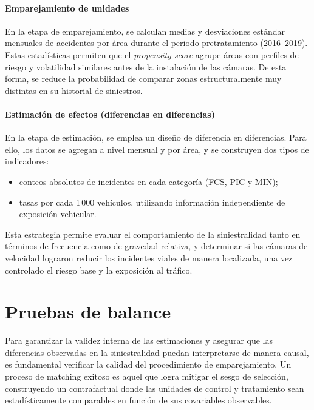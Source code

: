 \paragraph{Emparejamiento de unidades}

En la etapa de emparejamiento, se calculan medias y desviaciones estándar mensuales de accidentes por área durante el periodo pretratamiento (2016--2019). Estas estadísticas permiten que el \textit{propensity score} agrupe áreas con perfiles de riesgo y volatilidad similares antes de la instalación de las cámaras. De esta forma, se reduce la probabilidad de comparar zonas estructuralmente muy distintas en su historial de siniestros.

\paragraph{Estimación de efectos (diferencias en diferencias)}

En la etapa de estimación, se emplea un diseño de diferencia en diferencias. Para ello, los datos se agregan a nivel mensual y por área, y se construyen dos tipos de indicadores:

\begin{itemize}
    \item conteos absolutos de incidentes en cada categoría (FCS, PIC y MIN);
    \item tasas por cada 1\,000 vehículos, utilizando información independiente de exposición vehicular.
\end{itemize}

Esta estrategia permite evaluar el comportamiento de la siniestralidad tanto en términos de frecuencia como de gravedad relativa, y determinar si las cámaras de velocidad lograron reducir los incidentes viales de manera localizada, una vez controlado el riesgo base y la exposición al tráfico.

\section{Pruebas de balance}
Para garantizar la validez interna de las estimaciones y asegurar que las diferencias observadas en la siniestralidad puedan interpretarse de manera causal, es fundamental verificar la calidad del procedimiento de emparejamiento. Un proceso de matching exitoso es aquel que logra mitigar el sesgo de selección, construyendo un contrafactual donde las unidades de control y tratamiento sean estadísticamente comparables en función de sus covariables observables.


